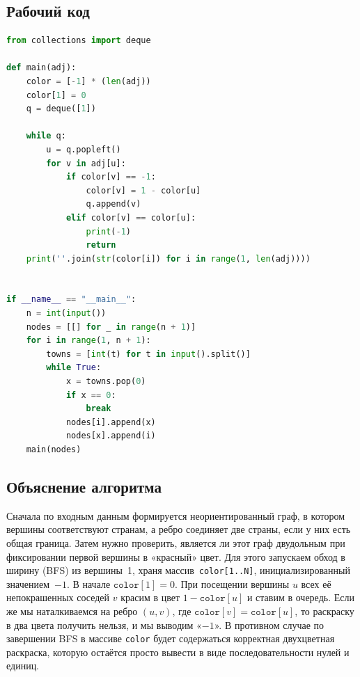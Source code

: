 \documentclass[a4paper,12pt]{article}
\begin{document}
\subsection*{Рабочий код}
\begin{lstlisting}[language=python]
from collections import deque

def main(adj):
    color = [-1] * (len(adj))
    color[1] = 0
    q = deque([1])

    while q:
        u = q.popleft()
        for v in adj[u]:
            if color[v] == -1:
                color[v] = 1 - color[u]
                q.append(v)
            elif color[v] == color[u]:
                print(-1)
                return
    print(''.join(str(color[i]) for i in range(1, len(adj))))


if __name__ == "__main__":
    n = int(input())
    nodes = [[] for _ in range(n + 1)]
    for i in range(1, n + 1):
        towns = [int(t) for t in input().split()]
        while True:
            x = towns.pop(0)
            if x == 0:
                break
            nodes[i].append(x)
            nodes[x].append(i)
    main(nodes)
\end{lstlisting}
\subsection*{Объяснение алгоритма}
Сначала по входным данным формируется неориентированный граф, в котором вершины соответствуют странам, а ребро соединяет две страны, если у них есть общая граница. Затем нужно проверить, является ли этот граф двудольным при фиксировании первой вершины в «красный» цвет. Для этого запускаем обход в ширину (BFS) из вершины 1, храня массив \texttt{color[1..N]}, инициализированный значением $-1$. В начале $\texttt{color}[1]=0$. При посещении вершины $u$ всех её непокрашенных соседей $v$ красим в цвет $1-\texttt{color}[u]$ и ставим в очередь. Если же мы наталкиваемся на ребро $(u,v)$, где $\texttt{color}[v]=\texttt{color}[u]$, то раскраску в два цвета получить нельзя, и мы выводим «$-1$». В противном случае по завершении BFS в массиве \texttt{color} будет содержаться корректная двухцветная раскраска, которую остаётся просто вывести в виде последовательности нулей и единиц.

\newpage
\end{document}
